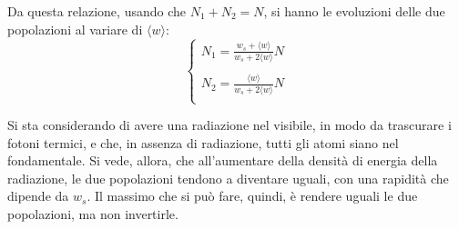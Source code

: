 \documentclass[11pt, a4paper]{scrartcl}
\theoremstyle{style}
\numberwithin{equation}{subsection}
\begin{document}
\begin{center}
	\begin{minipage}
		{.45\columnwidth}
Da questa relazione, usando che $N_1 + N_2 = N$, si hanno le evoluzioni delle due popolazioni al variare di $\langle w \rangle$:
\[
\begin{cases}
	\displaystyle N_1 = \frac{w_s  + \langle w \rangle}{w_s + 2 \langle w \rangle}N\\
	\\
	\displaystyle N_2 = \frac{\langle w \rangle}{w_s + 2 \langle w \rangle}N\\
\end{cases}
\] 
	\end{minipage}
	\hfill
	\begin{minipage}
		{.5\columnwidth}
	\centering
	
	\end{minipage}
\end{center}
Si sta considerando di avere una radiazione nel visibile, in modo da trascurare i fotoni termici, e che, in assenza di radiazione, tutti gli atomi siano nel fondamentale.
Si vede, allora, che all'aumentare della densit\`a di energia della radiazione, le due popolazioni tendono a diventare uguali, con una rapidit\`a che dipende da $w_s$.
Il massimo che si pu\`o fare, quindi, \`e rendere uguali le due popolazioni, ma non invertirle.
\end{document}
